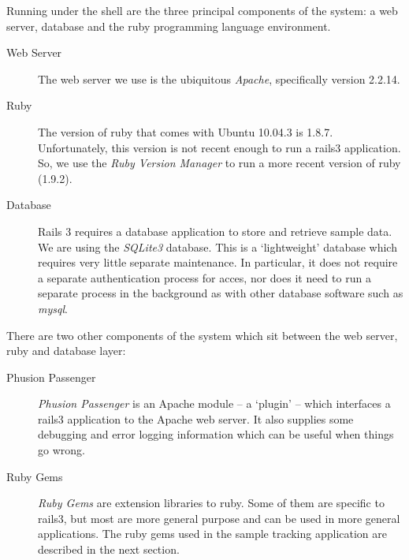 \documentclass[12pt,twoside]{article}
\begin{document}
Running under the shell are the three principal components of
the system: a web server, database and the ruby programming language
environment.
\begin{description}
\item[Web Server]
The web server we use is the ubiquitous \emph{Apache}, specifically
version 2.2.14.
\item[Ruby]
The version of ruby that comes with Ubuntu 10.04.3 is 1.8.7.
Unfortunately, this version is not recent enough to run a rails3
application. So, we use the \emph{Ruby Version Manager} to run a more
recent version of ruby (1.9.2).
\item[Database]
Rails 3 requires a database application to store and retrieve sample data.
We are using the \emph{SQLite3} database. This is a `lightweight' database
which requires very little separate maintenance. In particular, it
does not require a separate authentication process for acces, nor
does it need to run a separate process in the background as with other
database software such as \emph{mysql}.
\end{description}

There are two other components of the system which sit between the
web server, ruby and database layer:

\begin{description}
\item[Phusion Passenger]
\emph{Phusion Passenger} is an Apache module -- a `plugin' -- which
interfaces a rails3 application to the Apache web server. It also supplies
some debugging and error logging information which can be useful when
things go wrong.
\item[Ruby Gems]
\emph{Ruby Gems} are extension libraries to ruby. Some of them are
specific to rails3, but most are more general purpose and can be used in
more general applications. The ruby gems used in the sample tracking
application are described in the next section.
\end{description}
\end{document}
